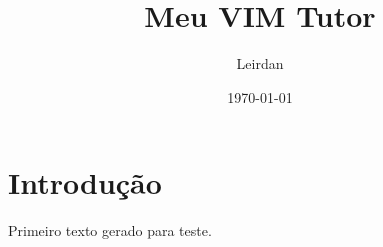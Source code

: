 \documentclass[12pt]{article}
\title{Meu VIM Tutor}
\author{Leirdan}
\date{\today}
\begin{document}
\maketitle

\section{Introdução}
Primeiro texto gerado para teste.
\end{document}
